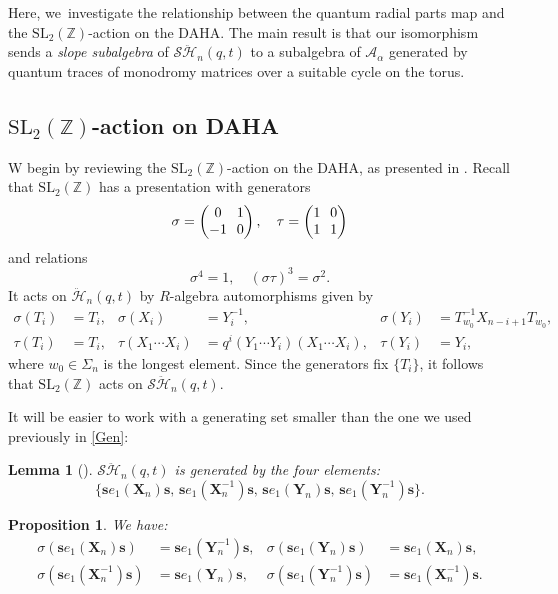 \documentclass[11pt]{article}
\newcommand{\SL}{\mathrm{SL}}
\newtheorem{prop}[thm]{Proposition}
\newtheorem{lem}[thm]{Lemma}
\theoremstyle{definition}
\newcommand{\ZZ}{\mathbb{Z}}
\newcommand{\AAA}{\mathcal{A}}
\newcommand{\SHH}{\mathcal{S}\ddot{\mathcal{H}}}
\newcommand{\HH}{\ddot{\mathcal{H}}}
\newcommand{\ee}{\boldsymbol{s}}
\begin{document}
Here, we~investigate the relationship between the quantum radial parts map and the $\SL_2(\ZZ)$-action on the DAHA.
The main result is that our isomorphism sends a \textit{slope subalgebra} of $\SHH_n(q,t)$ to a subalgebra of $\AAA_\alpha$ generated by quantum traces of monodromy matrices over a suitable cycle on the torus.

\subsection{$\SL_2(\ZZ)$-action on DAHA}
W begin by reviewing the $\SL_2(\ZZ)$-action on the DAHA, as presented in \cite[\S3.7]{ChereDAHA}.
Recall that $\SL_2(\ZZ)$ has a presentation with generators
\[\arraycolsep3.5pt
\sigma=
\begin{pmatrix}
0 & 1\\
-1 & 0
\end{pmatrix}
,\quad\tau=
\begin{pmatrix}
1 & 0\\
1 & 1
\end{pmatrix}
\]
and relations
\[
\sigma^4=1,\quad (\sigma\tau)^3=\sigma^2.
\]
It acts on $\HH_n(q,t)$ by $R$-algebra automorphisms given by
\begin{align*}\sigma(T_i)&=T_i, &\sigma(X_i)&=Y_i^{-1}, & \sigma(Y_i)&=T_{w_0}^{-1}X_{n-i+1}T_{w_0},\\
\tau(T_i)&=T_i, & \tau(X_1\cdots X_i)&=q^i(Y_1\cdots Y_i)(X_1\cdots X_i), & \tau(Y_i)&=Y_i,
\end{align*}
where $w_0\in\Sigma_n$ is the longest element.
Since the generators fix $\{T_i\}$, it follows that $\SL_2(\ZZ)$ acts on $\SHH_n(q,t)$.

It will be easier to work with a generating set smaller than the one we used previously in \ref{Gen}:

\begin{lem}[{\cite[Lem.\,5.2]{FFJMM}}]
$\SHH_n(q,t)$ is generated by the four elements:
\[
\bigl\{\ee e_1(\boldsymbol{X}_n)\ee,\,\ee e_1(\boldsymbol{X}_n^{-1})\ee,\,\ee e_1(\boldsymbol{Y}_n)\ee,\,\ee e_1(\boldsymbol{Y}_n^{-1})\ee \bigr\}.
\]
\end{lem}

\begin{prop}
We have:
\begin{align*}
\sigma(\ee e_1(\boldsymbol{X}_n)\ee)&=\ee e_1(\boldsymbol{Y}_n^{-1})\ee, &\sigma(\ee e_1(\boldsymbol{Y}_n)\ee)&=\ee e_1(\boldsymbol{X}_n)\ee,\\
\sigma(\ee e_1(\boldsymbol{X}_n^{-1})\ee)&=\ee e_1(\boldsymbol{Y}_n)\ee, &\sigma(\ee e_1(\boldsymbol{Y}_n^{- 1})\ee)&=\ee e_1(\boldsymbol{X}_n^{-1})\ee.
\end{align*}
\end{prop}
\end{document}
